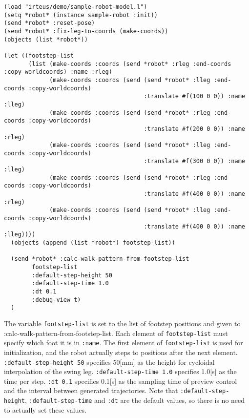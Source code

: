 {\baselineskip=10pt
\begin{verbatim}
(load "irteus/demo/sample-robot-model.l")
(setq *robot* (instance sample-robot :init))
(send *robot* :reset-pose)
(send *robot* :fix-leg-to-coords (make-coords))
(objects (list *robot*))

(let ((footstep-list
       (list (make-coords :coords (send *robot* :rleg :end-coords :copy-worldcoords) :name :rleg)
             (make-coords :coords (send (send *robot* :lleg :end-coords :copy-worldcoords)
                                        :translate #f(100 0 0)) :name :lleg)
             (make-coords :coords (send (send *robot* :rleg :end-coords :copy-worldcoords)
                                        :translate #f(200 0 0)) :name :rleg)
             (make-coords :coords (send (send *robot* :lleg :end-coords :copy-worldcoords)
                                        :translate #f(300 0 0)) :name :lleg)
             (make-coords :coords (send (send *robot* :rleg :end-coords :copy-worldcoords)
                                        :translate #f(400 0 0)) :name :rleg)
             (make-coords :coords (send (send *robot* :lleg :end-coords :copy-worldcoords)
                                        :translate #f(400 0 0)) :name :lleg))))
  (objects (append (list *robot*) footstep-list))

  (send *robot* :calc-walk-pattern-from-footstep-list
        footstep-list
        :default-step-height 50
        :default-step-time 1.0
        :dt 0.1
        :debug-view t)
  )
\end{verbatim}
}
The variable \verb|footstep-list| is set to the list of footstep positions and given to :calc-walk-pattern-from-footstep-list. Each element of \verb|footstep-list| must specify which foot it is in \verb|:name|. The first element of \verb|footstep-list| is used for initialization, and the robot actually steps to positions after the next element. \verb|:default-step-height 50| specifies 50[mm] as the height for cycloidal interpolation of the swing leg. \verb|:default-step-time 1.0| specifies 1.0[s] as the time per step. \verb|:dt 0.1| specifies 0.1[s] as the sampling time of preview control and the interval between generated trajectories. Note that \verb|:default-step-height|, \verb|:default-step-time| and \verb|:dt| are the default values, so there is no need to actually set these values.


